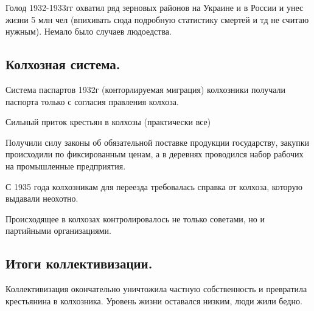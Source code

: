 Голод 1932-1933гг охватил ряд зерновых районов на Украине и в России и унес жизни 5 млн чел (впихивать сюда подробную статистику смертей и тд не считаю нужным). Немало было случаев людоедства.

\subsection{Колхозная система.}

Система паспартов 1932г (конторлируемая миграция)
колхозники получали паспорта только с согласия правления колхоза.

Сильный приток крестьян в колхозы (практически все)

Получили силу законы об обязательной поставке продукции государству, закупки происходили по фиксированным ценам, а в деревнях проводился набор рабочих на промышленные предприятия. 

С 1935 года колхозникам для переезда требовалась справка от колхоза, которую выдавали неохотно.

Происходящее в колхозах контролировалось не только советами, но и партийными организациями.

\subsection{Итоги коллективизации.}

Коллективизация окончательно уничтожила частную собственность и превратила крестьянина в колхозника. Уровень жизни оставался низким, люди жили бедно. 